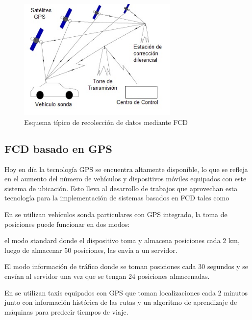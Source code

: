\begin{figure}[h]
	\centering
	\includegraphics[width=0.7\textwidth]{capitulos/3/figuras/figura4.jpg}
	\caption{\label{fig:ComunicacionGPS} Esquema típico de recolección de datos mediante FCD}	
\end{figure}

\subsection{FCD basado en GPS}

Hoy en día la tecnología GPS se encuentra altamente disponible, lo que se refleja en el aumento del número de vehículos y dispositivos móviles equipados con este sistema de ubicación. Esto lleva al desarrollo de trabajos que aprovechan esta tecnología para la implementación de sistemas basados en FCD tales como  \citep{giovannini2011novel,li2007practical,sevlian2010travel,yin2004weight}

En \citep{giovannini2011novel} se utilizan vehículos sonda particulares con GPS integrado, la toma de posiciones puede funcionar en dos modos: \begin{enumerate*}[1)] \item el modo standard donde el dispositivo toma y almacena posiciones cada 2 km, luego de almacenar 50 posiciones, las envía a un servidor. \item El modo información de tráfico donde se toman posiciones cada 30 segundos y se envían al servidor una vez que se tengan 24 posiciones almacenadas.\end{enumerate*}

En \citep{sevlian2010travel} se utilizan taxis equipados con GPS que toman localizaciones cada 2 minutos junto con información histórica de las rutas y un algoritmo de aprendizaje de máquinas para predecir tiempos de viaje.


